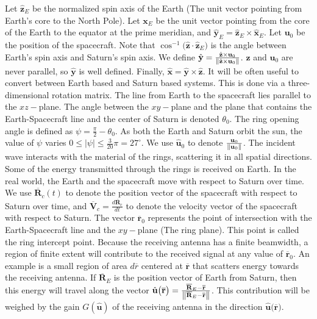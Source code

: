 \documentclass{article}
\theoremstyle{mystyle}
\begin{document}
\noindent Let $\hat{\mathbf{z}}_{E}$ be the normalized spin axis of the Earth (The unit vector pointing from Earth's core to the North Pole). Let $\mathbf{x}_{E}$ be the unit vector pointing from the core of the Earth to the equator at the prime meridian, and $\hat{\mathbf{y}}_{E} = \hat{\mathbf{z}}_{E}\times \hat{\mathbf{x}}_{E}$. Let $\mathbf{u}_{0}$ be the position of the spacecraft. Note that $\cos^{-1}\big(\hat{\mathbf{z}}\cdot\hat{\mathbf{z}}_{E}\big)$ is the angle between Earth's spin axis and Saturn's spin axis. We define $\hat{\mathbf{y}} = \frac{\hat{\mathbf{z}}\times \mathbf{u}_{0}}{\norm{\hat{\mathbf{z}}\times \mathbf{u}_{0}}}$. $\hat{\mathbf{z}}$ and $\mathbf{u}_{0}$ are never parallel, so $\hat{\mathbf{y}}$ is well defined. Finally, $\hat{\mathbf{x}} = \hat{\mathbf{y}}\times \hat{\mathbf{z}}$. It will be often useful to convert between Earth based and Saturn based systems. This is done via a three-dimensional rotation matrix. The line from Earth to the spacecraft lies parallel to the $xz-$plane. The angle between the $xy-$plane and the plane that contains the Earth-Spacecraft line and the center of Saturn is denoted $\theta_{0}$. The ring opening angle is defined as $\psi = \frac{\pi}{2} - \theta_{0}$. As both the Earth and Saturn orbit the sun, the value of $\psi$ varies $0\leq |\psi| \leq \frac{3}{20}\pi = 27^{\circ}$. We use $\hat{\mathbf{u}}_{0}$ to denote $\frac{\mathbf{u}_{0}}{\norm{\mathbf{u}_{0}}}$. The incident wave interacts with the material of the rings, scattering it in all spatial directions. Some of the energy transmitted through the rings is received on Earth. In the real world, the Earth and the spacecraft move with respect to Saturn over time. We use $\overline{\mathbf{R}}_{c}(t)$ to denote the position vector of the spacecraft with respect to Saturn over time, and $\overline{\mathbf{V}}_{c} = \frac{d \overline{\mathbf{R}}_{c}}{dt}$ to denote the velocity vector of the spacecraft with respect to Saturn. The vector $\overline{\mathbf{r}}_{0}$ represents the point of intersection with the Earth-Spacecraft line and the $xy-$plane (The ring plane). This point is called the ring intercept point. Because the receiving antenna has a finite beamwidth, a region of finite extent will contribute to the received signal at any value of $\overline{\mathbf{r}}_{0}$. An example is a small region of area $d\overline{r}$ centered at $\overline{\mathbf{r}}$ that scatters energy towards the receiving antenna. If $\overline{\mathbf{R}}_{E}$ is the position vector of Earth from Saturn, then this energy will travel along the vector $\hat{\mathbf{u}}\big(\overline{\mathbf{r}}\big) = \frac{\overline{\mathbf{R}}_{E}-\overline{\mathbf{r}}}{\norm{\overline{\mathbf{R}}_{E}-\overline{\mathbf{r}}}}$. This contribution will be weighed by the gain $G(\hat{\mathbf{u}})$ of the receiving antenna in the direction $\hat{\mathbf{u}}\big(\overline{\mathbf{r}}\big)$. 
\end{document}
